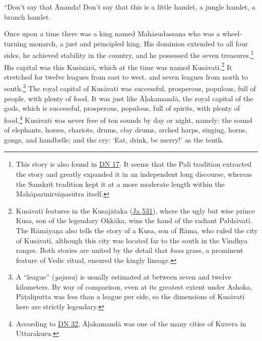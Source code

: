 \documentclass[12pt,openany]{book}%
\begin{document}
“Don’t say that Ānanda! Don’t say that this is a little hamlet, a jungle hamlet, a branch hamlet. 

Once upon a time there was a king named \textsanskrit{Mahāsudassana} who was a wheel-turning monarch, a just and principled king. His dominion extended to all four sides, he achieved stability in the country, and he possessed the seven treasures.\footnote{This story is also found in \href{https://suttacentral.net/dn17/en/sujato}{DN 17}. It seems that the Pali tradition extracted the story and greatly expanded it in an independent long discourse, whereas the Sanskrit tradition kept it at a more moderate length within the \textsanskrit{Mahāparinirvāṇasūtra} itself. } His capital was this \textsanskrit{Kusinārā}, which at the time was named \textsanskrit{Kusāvatī}.\footnote{\textsanskrit{Kusāvatī} features in the \textsanskrit{Kusajātaka} (\href{https://suttacentral.net/ja531/en/sujato}{Ja 531}), where the ugly but wise prince Kusa, son of the legendary \textsanskrit{Okkāka}, wins the hand of the radiant \textsanskrit{Pabhāvatī}. The \textsanskrit{Rāmāyaṇa} also tells the story of a Kusa, son of \textsanskrit{Rāma}, who ruled the city of \textsanskrit{Kusāvatī}, although this city was located far to the south in the Vindhya ranges. Both stories are united by the detail that \textit{kusa} grass, a prominent feature of Vedic ritual, ensured the kingly lineage. } It stretched for twelve leagues from east to west, and seven leagues from north to south.\footnote{A “league” (\textit{yojana}) is usually estimated at between seven and twelve kilometers. By way of comparison, even at its greatest extent under Ashoka, \textsanskrit{Pāṭaliputta} was less than a league per side, so the dimensions of \textsanskrit{Kusāvatī} here are strictly legendary. } The royal capital of \textsanskrit{Kusāvatī} was successful, prosperous, populous, full of people, with plenty of food. It was just like \textsanskrit{Āḷakamandā}, the royal capital of the gods, which is successful, prosperous, populous, full of spirits, with plenty of food.\footnote{According to \href{https://suttacentral.net/dn32/en/sujato}{DN 32}, \textsanskrit{Āḷakamandā} was one of the many cities of Kuvera in Uttarakuru. } \textsanskrit{Kusāvatī} was never free of ten sounds by day or night, namely: the sound of elephants, horses, chariots, drums, clay drums, arched harps, singing, horns, gongs, and handbells; and the cry: ‘Eat, drink, be merry!’ as the tenth. 
\end{document}
